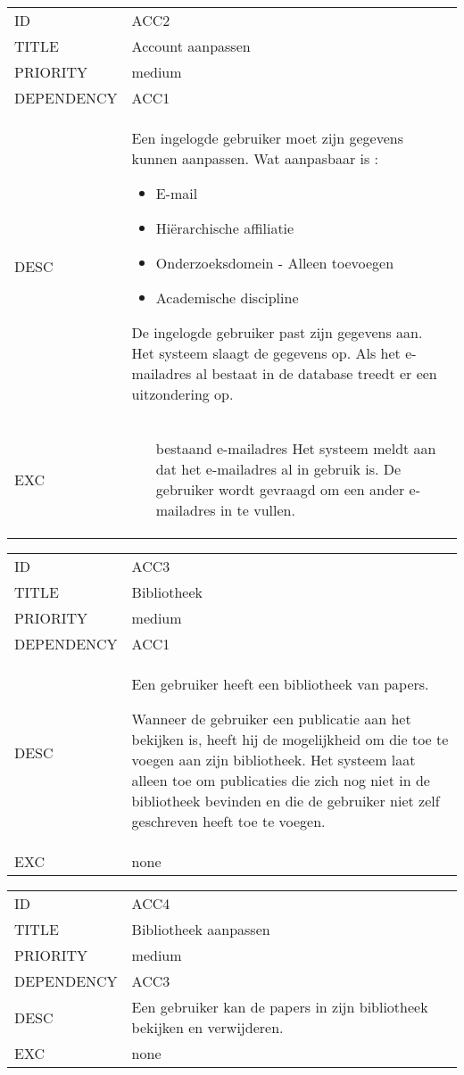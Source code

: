 \begin{longtable}{lp{10cm}}
ID           & ACC2\\
TITLE        & Account aanpassen\\
PRIORITY     & medium\\
DEPENDENCY   & ACC1\\
DESC         & Een ingelogde gebruiker moet zijn gegevens kunnen aanpassen.
Wat aanpasbaar is :
\begin{itemize}
  \item E-mail
  \item Hiërarchische affiliatie
  \item Onderzoeksdomein - Alleen toevoegen
  \item Academische discipline
\end{itemize}
De ingelogde gebruiker past zijn gegevens aan. Het systeem slaagt de gegevens op. Als het e-mailadres al bestaat in de database treedt er een uitzondering op.\\
EXC          &
\begin{itemize}
\item [bestaand e-mailadres] Het systeem meldt aan dat het e-mailadres al in gebruik is. De gebruiker wordt gevraagd om een ander e-mailadres in te vullen.
\end{itemize}
\end{longtable}

\begin{longtable}{lp{10cm}}
ID           & ACC3\\
TITLE        & Bibliotheek\\
PRIORITY     & medium\\
DEPENDENCY   & ACC1\\
DESC         & Een gebruiker heeft een bibliotheek van papers.

Wanneer de gebruiker een publicatie aan het bekijken is, heeft hij de mogelijkheid om die toe te voegen aan zijn bibliotheek. Het systeem laat alleen toe om publicaties die zich nog niet in de bibliotheek bevinden en die de gebruiker niet zelf geschreven heeft toe te voegen.\\
EXC          & none
\end{longtable}

\begin{longtable}{lp{10cm}}
ID           & ACC4\\
TITLE        & Bibliotheek aanpassen\\
PRIORITY     & medium\\
DEPENDENCY   & ACC3\\
DESC         & Een gebruiker kan de papers in zijn bibliotheek bekijken en verwijderen.\\
EXC          & none
\end{longtable}

